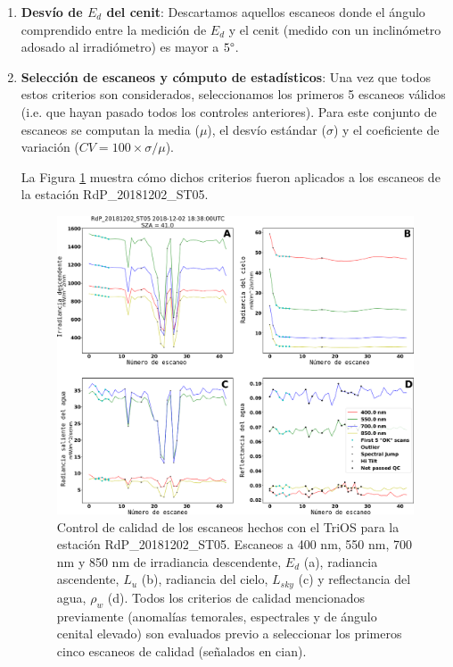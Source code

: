 \begin{enumerate}
                \item \textbf{Desvío de $E_{d}$ del cenit}: Descartamos aquellos escaneos donde el ángulo comprendido entre la medición de $E_{d}$ y el cenit (medido con un inclinómetro adosado al irradiómetro) es mayor a $5 \degree$.
            
                \item \textbf{Selección de escaneos y cómputo de estadísticos}: Una vez que todos estos criterios son considerados, seleccionamos los primeros 5 escaneos válidos (i.e. que hayan pasado todos los controles anteriores). Para este conjunto de escaneos se computan la media ($\mu$), el desvío estándar ($\sigma$) y el coeficiente de variación ($CV = 100\times\sigma/\mu$).

                La Figura \ref{dat:TriOS_QC} muestra cómo dichos criterios fueron aplicados a los escaneos de la estación RdP\_20181202\_ST05.
            
                \begin{figure}
                \centering
                \includegraphics[width=\textwidth]{dat/figures/TriOS_QC.png}
                \caption[Control de calidad de los escaneos hechos con el TriOS para la estación RdP\_20181202\_ST05.]{Control de calidad de los escaneos hechos con el TriOS para la estación RdP\_20181202\_ST05. Escaneos a 400 nm, 550 nm, 700 nm y 850 nm de irradiancia descendente, $E_{d}$ (a), radiancia ascendente, $L_{u}$ (b), radiancia del cielo, $L_{sky}$ (c) y reflectancia del agua, $\rho_{w}$ (d). Todos los criterios de calidad mencionados previamente (anomalías temorales, espectrales y de ángulo cenital elevado) son evaluados previo a seleccionar los primeros cinco escaneos de calidad (señalados en cian).} 
                \label{dat:TriOS_QC}
                \end{figure}
                

\end{enumerate}
